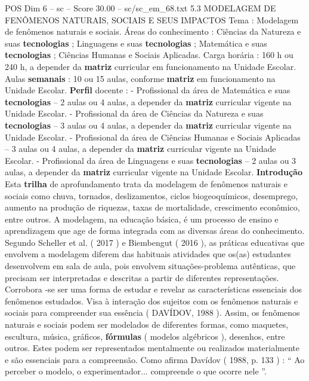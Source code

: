 \begin{textsample}{POS Dim 6 – sc – Score 30.00 – sc/sc\_em\_68.txt}  \label{ex:f6_pos_005}
5.3 MODELAGEM DE FENÔMENOS NATURAIS, SOCIAIS E SEUS IMPACTOS Tema : Modelagem de fenômenos naturais e sociais.
Áreas do conhecimento : Ciências da Natureza e suas \textbf{tecnologias} ; Linguagens e suas \textbf{tecnologias} ; Matemática e suas \textbf{tecnologias} ; Ciências Humanas e Sociais Aplicadas.
Carga horária : 160 h ou 240 h, a depender da \textbf{matriz} curricular em funcionamento na Unidade Escolar.
Aulas \textbf{semanais} : 10 ou 15 aulas, conforme \textbf{matriz} em funcionamento na Unidade Escolar. \textbf{Perfil} docente : - Profissional da área de Matemática e suas \textbf{tecnologias} – 2 aulas ou 4 aulas, a depender da \textbf{matriz} curricular vigente na Unidade Escolar. - Profissional da área de Ciências da Natureza e suas \textbf{tecnologias} – 3 aulas ou 4 aulas, a depender da \textbf{matriz} curricular vigente na Unidade Escolar. - Profissional da área de Ciências Humanas e Sociais Aplicadas – 3 aulas ou 4 aulas, a depender da \textbf{matriz} curricular vigente na Unidade Escolar. - Profissional da área de Linguagens e suas \textbf{tecnologias} – 2 aulas ou 3 aulas, a depender da \textbf{matriz} curricular vigente na Unidade Escolar. \textbf{Introdução} Esta \textbf{trilha} de aprofundamento trata da modelagem de fenômenos naturais e sociais como chuva, tornados, deslizamentos, ciclos biogeoquímicos, desemprego, aumento na produção de riquezas, taxas de mortalidade, crescimento econômico, entre outros.
A modelagem, na educação básica, é um processo de ensino e aprendizagem que age de forma integrada com as diversas áreas do conhecimento.
Segundo Scheller et al. ( 2017 ) e Biembengut ( 2016 ), as práticas educativas que envolvem a modelagem diferem das habituais atividades que os(as) estudantes desenvolvem em sala de aula, pois envolvem situações-problema autênticas, que precisam ser interpretadas e descritas a partir de diferentes representações.
Corrobora -se ser uma forma de estudar e revelar as características essenciais dos fenômenos estudados.
Visa à interação dos sujeitos com os fenômenos naturais e sociais para compreender sua essência ( DAVÍDOV, 1988 ).
Assim, os fenômenos naturais e sociais podem ser modelados de diferentes formas, como maquetes, escultura, música, gráficos, \textbf{fórmulas} ( modelos algébricos ), desenhos, entre outros.
Estes podem ser representados mentalmente ou realizados materialmente e são essenciais para a compreensão.
Como afirma Davídov ( 1988, p. 133 ) : “ Ao perceber o modelo, o experimentador... compreende o que ocorre nele ”.

\end{textsample}
